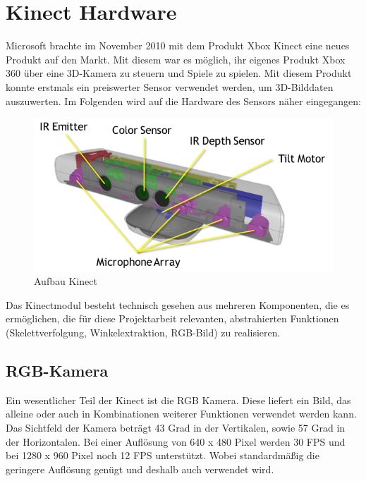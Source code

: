 \section{Kinect Hardware}
Microsoft brachte im November 2010 mit dem Produkt Xbox Kinect eine neues Produkt auf den Markt. Mit diesem war es möglich, ihr eigenes Produkt Xbox 360 über eine 3D-Kamera zu steuern und Spiele zu spielen. 
Mit diesem Produkt konnte erstmals ein preiswerter Sensor verwendet werden, um 3D-Bilddaten auszuwerten.
Im Folgenden wird auf die Hardware des Sensors näher eingegangen:\\[0.2cm]

\begin{figure}[H]						
	\centering							
	\includegraphics[scale=0.9]{Bilder/kinect_sensor_aufbau.png}			
	\caption{Aufbau Kinect\cite{ws:microsoft_kinect}}						
	\label{f:kinect_hardware}						
\end{figure}

\noindent
Das Kinectmodul besteht technisch gesehen aus mehreren Komponenten, die es ermöglichen, die
für diese Projektarbeit relevanten, abstrahierten Funktionen (Skelettverfolgung, Winkelextraktion, RGB-Bild)
zu realisieren. \cite{webb2012beginning}

\subsection{RGB-Kamera}

	Ein wesentlicher Teil der Kinect ist die RGB Kamera. Diese liefert ein Bild, das alleine
	oder auch in Kombinationen weiterer Funktionen verwendet werden kann.
	Das Sichtfeld der Kamera beträgt 43 Grad in der Vertikalen, sowie 57 Grad in der Horizontalen.
	Bei einer Auflösung von 640 x 480 Pixel werden 30 FPS und bei 1280 x 960 Pixel noch 12 FPS unterstützt.
	Wobei standardmäßig die geringere Auflösung genügt und deshalb auch verwendet wird.
	\cite{jana2012kinect}	

